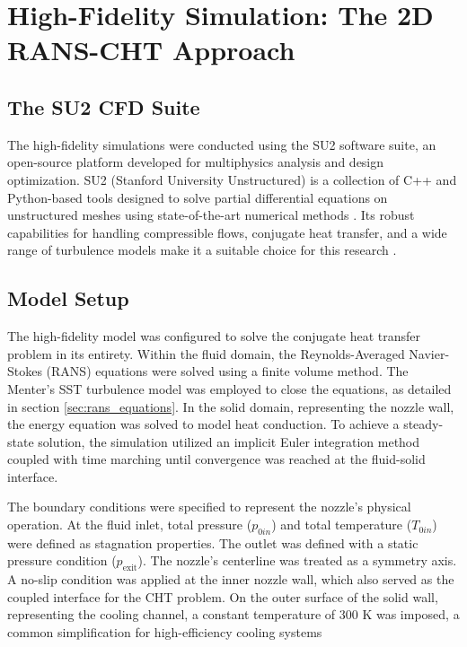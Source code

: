 \documentclass[tg, EN]{ufabcFHZh_tg}
\begin{document}
\section{High-Fidelity Simulation: The 2D RANS-CHT Approach}

\subsection{The SU2 CFD Suite}

The high-fidelity simulations were conducted using the SU2 software suite, an open-source platform developed for multiphysics analysis and design optimization. SU2 (Stanford University Unstructured) is a collection of C++ and Python-based tools designed to solve partial differential equations on unstructured meshes using state-of-the-art numerical methods \citep{economon2016}. Its robust capabilities for handling compressible flows, conjugate heat transfer, and a wide range of turbulence models make it a suitable choice for this research \citep{economon2016, palacios2022}.

\subsection{Model Setup}

The high-fidelity model was configured to solve the conjugate heat transfer problem in its entirety. Within the fluid domain, the Reynolds-Averaged Navier-Stokes (RANS) equations were solved using a finite volume method. The Menter's SST turbulence model was employed to close the equations, as detailed in section \ref{sec:rans_equations}. In the solid domain, representing the nozzle wall, the energy equation was solved to model heat conduction. To achieve a steady-state solution, the simulation utilized an implicit Euler integration method coupled with time marching until convergence was reached at the fluid-solid interface.

The boundary conditions were specified to represent the nozzle's physical operation. At the fluid inlet, total pressure ($p_{0in}$) and total temperature ($T_{0in}$) were defined as stagnation properties. The outlet was defined with a static pressure condition ($p_{\text{exit}}$). The nozzle's centerline was treated as a symmetry axis. A no-slip condition was applied at the inner nozzle wall, which also served as the coupled interface for the CHT problem. On the outer surface of the solid wall, representing the cooling channel, a constant temperature of 300 K was imposed, a common simplification for high-efficiency cooling systems %
\end{document}
